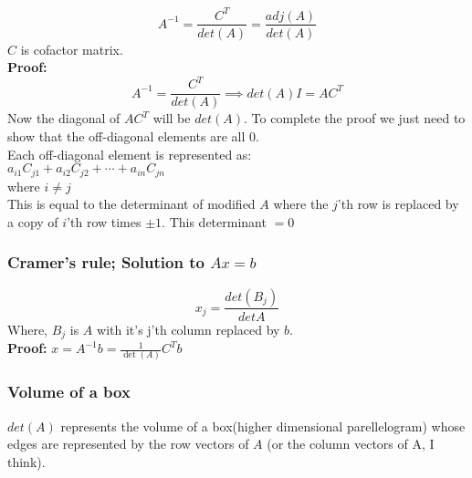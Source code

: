 $$A^{-1} = \frac{C^T}{det(A)} = \frac{adj(A)}{det(A)}$$
$C$ is cofactor matrix.\\
\textbf{Proof:}\\
$$A^{-1} = \frac{C^T}{det(A)} \implies det(A)I = AC^T$$
Now the diagonal of $AC^T$ will be $det(A)$. To complete the proof we just need to show that the
off-diagonal elements are all 0.\\
Each off-diagonal element is represented as:\\
$a_{i1}C_{j1} + a_{i2}C_{j2} + \cdots + a_{in}C_{jn}$\\
where $i \neq j$\\
This is equal to the determinant of modified $A$ where the $j$'th row 
is replaced by a copy of $i$'th row times $\pm 1$. This determinant $ = 0$\\

\subsubsection{Cramer's rule; Solution to $Ax = b$}

$$x_j = \frac{det(B_j)}{det A}$$
Where, $B_j$ is $A$ with it's j'th column replaced by $b$.\\
\textbf{Proof:} $x = A^{-1}b = \frac{1}{\det(A)}C^Tb$

\subsubsection{Volume of a box}
$det(A)$ represents the volume of a box(higher dimensional parellelogram) whose edges are represented by the row vectors of $A$ (or the column vectors of A, I think).

